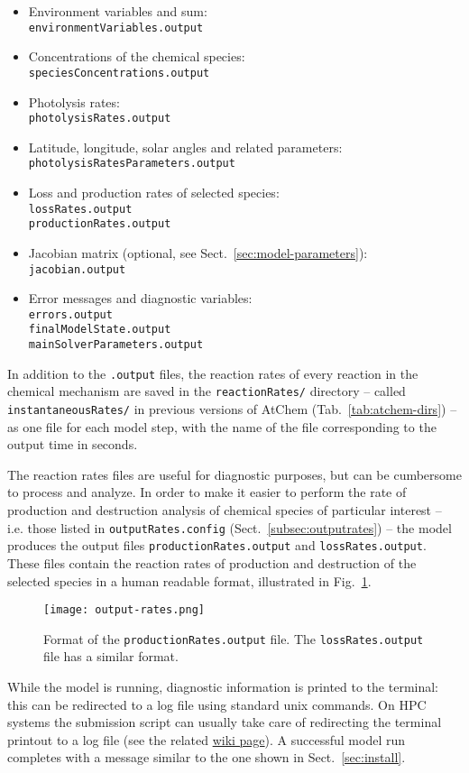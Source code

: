 \begin{itemize}
\item Environment variables and  sum:\\
  \texttt{environmentVariables.output}
\item Concentrations of the chemical species:\\
  \texttt{speciesConcentrations.output}
\item Photolysis rates:\\
  \texttt{photolysisRates.output}
\item Latitude, longitude, solar angles and related parameters:\\
  \texttt{photolysisRatesParameters.output}
\item Loss and production rates of selected species:\\
  \texttt{lossRates.output}\\
  \texttt{productionRates.output}
\item Jacobian matrix (optional, see Sect.~\ref{sec:model-parameters}):\\
  \texttt{jacobian.output}
\item Error messages and diagnostic variables:\\
  \texttt{errors.output}\\
  \texttt{finalModelState.output}\\
  \texttt{mainSolverParameters.output}
\end{itemize}

In addition to the \texttt{.output} files, the reaction rates of every
reaction in the chemical mechanism are saved in the
\texttt{reactionRates/} directory -- called
\texttt{instantaneousRates/} in previous versions of AtChem
(Tab.~\ref{tab:atchem-dirs}) -- as one file for each model step, with
the name of the file corresponding to the output time in seconds.

The reaction rates files are useful for diagnostic purposes, but can
be cumbersome to process and analyze. In order to make it easier to
perform the rate of production and destruction analysis of chemical
species of particular interest -- i.e. those listed in
\texttt{outputRates.config} (Sect.~\ref{subsec:outputrates}) -- the
model produces the output files \texttt{productionRates.output} and
\texttt{lossRates.output}. These files contain the reaction rates of
production and destruction of the selected species in a human readable
format, illustrated in Fig.~\ref{fig:ropa}.

\begin{figure}[htb]
  \centering
  \texttt{[image: output-rates.png]}
  \caption{Format of the \texttt{productionRates.output} file. The
    \texttt{lossRates.output} file has a similar format.}
  \label{fig:ropa}
\end{figure}

While the model is running, diagnostic information is printed to the
terminal: this can be redirected to a log file using standard unix
commands. On HPC systems the submission script can usually take care
of redirecting the terminal printout to a log file (see the related
\href{https://github.com/AtChem/AtChem2/wiki/Running-on-HPC}{wiki page}).
A successful model run completes with a message similar to the one
shown in Sect.~\ref{sec:install}.
